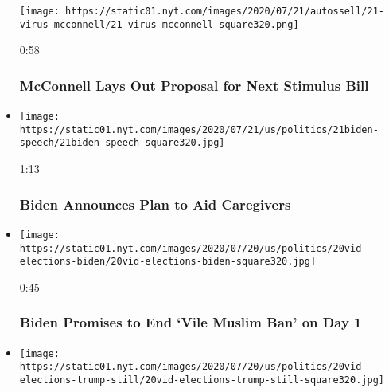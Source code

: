 \begin{itemize}
  \texttt{[image: https://static01.nyt.com/images/2020/07/21/autossell/21-virus-mcconnell/21-virus-mcconnell-square320.png]}

  0:58

  \hypertarget{mcconnell-lays-out-proposal-for-next-stimulus-bill}{%
  \subsubsection{McConnell Lays Out Proposal for Next Stimulus
  Bill}\label{mcconnell-lays-out-proposal-for-next-stimulus-bill}}
\item
  \href{https://www.nytimes.com/video/us/100000007249436/biden-announces-plan-to-aid-caregivers.html?action=click\&module=video-series-bar\&region=header\&pgtype=Article\&playlistId=video/us-politics}{}

  \texttt{[image: https://static01.nyt.com/images/2020/07/21/us/politics/21biden-speech/21biden-speech-square320.jpg]}

  1:13

  \hypertarget{biden-announces-plan-to-aid-caregivers}{%
  \subsubsection{Biden Announces Plan to Aid
  Caregivers}\label{biden-announces-plan-to-aid-caregivers}}
\item
  \href{https://www.nytimes.com/video/us/100000007248132/biden-muslim-voters.html?action=click\&module=video-series-bar\&region=header\&pgtype=Article\&playlistId=video/us-politics}{}

  \texttt{[image: https://static01.nyt.com/images/2020/07/20/us/politics/20vid-elections-biden/20vid-elections-biden-square320.jpg]}

  0:45

  \hypertarget{biden-promises-to-end-vile-muslim-ban-on-day-1}{%
  \subsubsection{Biden Promises to End `Vile Muslim Ban' on Day
  1}\label{biden-promises-to-end-vile-muslim-ban-on-day-1}}
\item
  \href{https://www.nytimes.com/video/us/100000007247868/trump-deploy-federal-agents.html?action=click\&module=video-series-bar\&region=header\&pgtype=Article\&playlistId=video/us-politics}{}

  \texttt{[image: https://static01.nyt.com/images/2020/07/20/us/politics/20vid-elections-trump-still/20vid-elections-trump-still-square320.jpg]}


\end{itemize}
